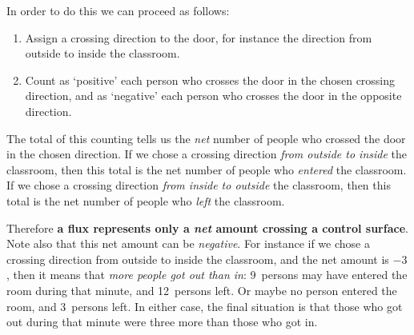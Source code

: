 \documentclass[a4paper,12pt,%
onecolumn,oneside,%
british%
]{memoir}
\renewcommand*{\|}[1][]{\nonscript\:#1\vert\nonscript\:\mathopen{}}
\begin{document}
In order to do this we can proceed as follows:
\begin{enumerate}[label=\arabic*.]
\item Assign a crossing direction to the door, for instance the direction from outside to inside the classroom.
\item Count as \enquote*{positive} each person who crosses the door in the chosen crossing direction, and as \enquote*{negative} each person who crosses the door in the opposite direction.
\end{enumerate}
The total of this counting tells us the \emph{net} number of people who crossed the door in the chosen direction. If we chose a crossing direction \emph{from outside to inside} the classroom, then this total is the net number of people who
\emph{entered} the classroom. If we chose a crossing direction \emph{from inside to outside} the classroom, then this total is the net number of people who
\emph{left} the classroom.

Therefore \textbf{a flux represents only a \emph{net} amount crossing a control surface}. Note also that this net amount can be \emph{negative}. For instance if we chose a crossing direction from outside to inside the classroom, and the net amount is $\num{-3}$, then it means that \emph{more people got out than in}: 9~persons may have entered the room during that minute, and 12~persons left. Or maybe no person entered the room, and 3~persons left. In either case, the final situation is that those who got out during that minute were three more than those who got in.
\end{document}
